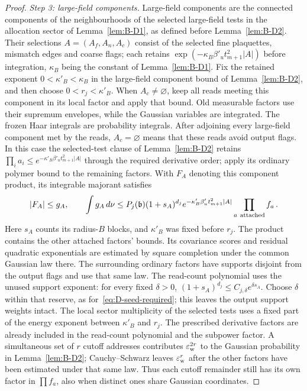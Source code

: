 \begin{proof}
\emph{Step 3: large-field components.} Large-field components are the connected components of the neighbourhoods of the selected large-field tests in the allocation sector of Lemma~\ref{lem:B-D1}, as defined before Lemma~\ref{lem:B-D2}. Their selections $A=(A_f,A_n,A_c)$ consist of the selected fine plaquettes, mismatch edges and coarse flags; each retains $\exp(-\kappa_B\beta'_u t_{m+1}^2|A|)$ before integration, $\kappa_B$ being the constant of Lemma~\ref{lem:B-D1}. Fix the retained exponent $0<\kappa'_B<\kappa_B$ in the large-field component bound of Lemma~\ref{lem:B-D2}, and then choose $0<r_j<\kappa'_B$. When $A_c\ne\varnothing$, keep all reads meeting this component in its local factor and apply that bound. Old measurable factors use their supremum envelopes, while the Gaussian variables are integrated. The frozen Haar integrals are probability integrals. After adjoining every large-field component met by the reads, $A_c=\varnothing$ means that these reads avoid output flags. In this case the selected-test clause of Lemma~\ref{lem:B-D2} retains $\prod_i a_i\le e^{-\kappa'_B\beta'_u t_{m+1}^2|A|}$ through the required derivative order; apply its ordinary polymer bound to the remaining factors. With $F_A$ denoting this component product, its integrable majorant satisfies
\begin{equation*}
|F_A|\le g_A,\qquad
\int g_A\,d\nu\le P_j(\mathfrak b)(1+s_A)^{d_j}
 e^{-\kappa'_B\beta'_u t_{m+1}^2|A|}\prod_{a\ {\rm attached}}f_a\,.
\end{equation*}
Here $s_A$ counts its radius-$B$ blocks, and $\kappa'_B$ was fixed before $r_j$. The product contains the other attached factors' bounds. Its covariance scores and residual quadratic exponentials are estimated by square completion under the common Gaussian law there. The surrounding ordinary factors have supports disjoint from the output flags and use that same law. The read-count polynomial uses the unused support exponent: for every fixed $\delta>0$, $(1+s_A)^{d_j}\le C_{j,\delta}e^{\delta s_A}$. Choose $\delta$ within that reserve, as for~\eqref{eq:D-seed-required}; this leaves the output support weights intact. The local sector multiplicity of the selected tests uses a fixed part of the energy exponent between $\kappa'_B$ and $r_j$. The prescribed derivative factors are already included in the read-count polynomial and the subpower factor. A simultaneous set of $r$ cutoff addresses contributes $\varepsilon_{\rm w}^{2r}$ to the Gaussian probability in Lemma~\ref{lem:B-D2}; Cauchy--Schwarz leaves $\varepsilon_{\rm w}^r$ after the other factors have been estimated under that same law. Thus each cutoff remainder still has its own factor in $\prod f_a$, also when distinct ones share Gaussian coordinates.


\end{proof}
